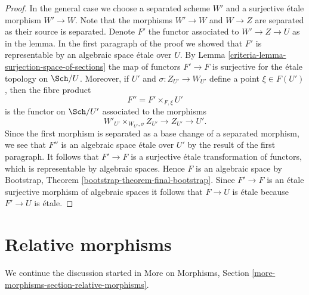 \begin{proof}
\medskip\noindent
In the general case we choose a separated scheme $W'$ and a surjective
\'etale morphism $W' \to W$. Note that the morphisms $W' \to W$ and
$W \to Z$ are separated as their source is separated. Denote $F'$ the
functor associated to $W' \to Z \to U$ as in the lemma. In the first
paragraph of the proof we showed that $F'$ is representable by an
algebraic space \'etale over $U$. By
Lemma \ref{criteria-lemma-surjection-space-of-sections}
the map of functors $F' \to F$ is surjective for the \'etale topology
on $\Sch/U$. Moreover, if $U'$ and $\sigma : Z_{U'} \to W_{U'}$
define a point $\xi \in F(U')$, then the fibre product
$$
F'' = F' \times_{F, \xi} U'
$$
is the functor on $\Sch/U'$ associated to the morphisms
$$
W'_{U'} \times_{W_{U'}, \sigma} Z_{U'} \to Z_{U'} \to U'.
$$
Since the first morphism is separated as a base change of a separated
morphism, we see that $F''$ is an algebraic space \'etale over $U'$
by the result of the first paragraph. It follows that $F' \to F$ is a
surjective \'etale transformation of functors, which is representable
by algebraic spaces. Hence $F$ is an algebraic space by
Bootstrap, Theorem \ref{bootstrap-theorem-final-bootstrap}.
Since $F' \to F$ is an \'etale surjective morphism of algebraic spaces
it follows that $F \to U$ is \'etale because $F' \to U$ is \'etale.
\end{proof}

\section{Relative morphisms}
\label{criteria-section-relative-morphisms}
We continue the discussion started in
More on Morphisms, Section \ref{more-morphisms-section-relative-morphisms}.

